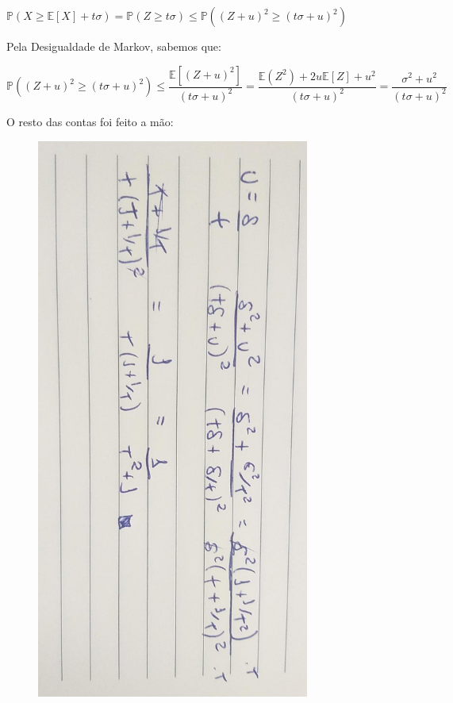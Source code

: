 \documentclass{article}
\begin{document}
\begin{itemize}
	      \(\mathbb{P}(X \geq \mathbb{E}[X] + t \sigma) = \mathbb{P}(Z \geq t \sigma) \leq \mathbb{P}((Z + u)^2 \geq (t \sigma + u)^2)\)

	      Pela Desigualdade de Markov, sabemos que:

	      \[\mathbb{P}((Z + u)^2 \geq (t \sigma + u)^2) \leq \frac{\mathbb{E}[(Z + u)^2]}{(t \sigma+ u)^2} = \frac{\mathbb{E}(Z^2) + 2u\mathbb{E}[Z] + u^2}{(t\sigma + u)^2} = \frac{\sigma^2 + u^2}{(t \sigma + u)^2}\]

	      O resto das contas foi feito a mão:

	      \begin{figure}[H]
		      \centering
		      \includegraphics[angle=90,origin=c,width=0.8\textwidth]{images/584.jpeg}
	      \end{figure}


\end{itemize}
\end{document}
